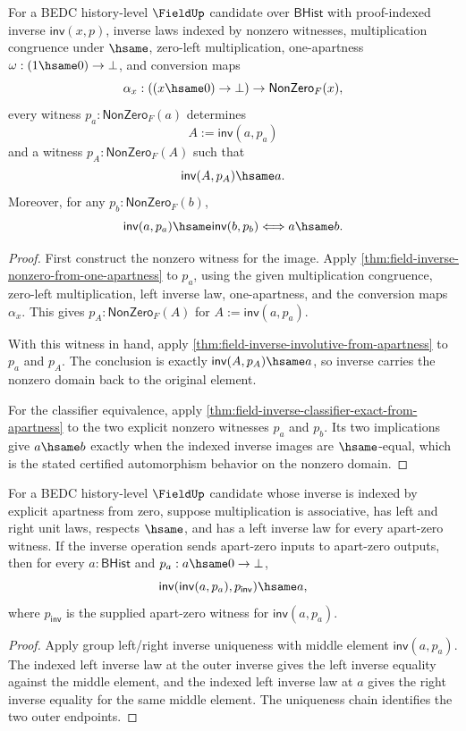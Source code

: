 \begin{theorem}
\label{thm:field-inverse-nonzero-domain-automorphism}
For a BEDC history-level $\FieldUp$ candidate over $\mathsf{BHist}$ with
proof-indexed inverse $\mathsf{inv}(x,p)$, inverse laws indexed by
nonzero witnesses, multiplication congruence under $\hsame$, zero-left
multiplication, one-apartness $\omega:(1\hsame 0)\to\bot$, and conversion
maps
$$
\alpha_x:((x\hsame 0)\to\bot)\to\mathsf{NonZero}_F(x),
$$
every witness $p_a:\mathsf{NonZero}_F(a)$ determines
$$
A:=\mathsf{inv}(a,p_a)
$$
and a witness $p_A:\mathsf{NonZero}_F(A)$ such that
$$
\mathsf{inv}(A,p_A)\hsame a.
$$
Moreover, for any $p_b:\mathsf{NonZero}_F(b)$,
$$
\mathsf{inv}(a,p_a)\hsame\mathsf{inv}(b,p_b)
\Longleftrightarrow a\hsame b.
$$
\end{theorem}
\begin{proof}
First construct the nonzero witness for the image. Apply
\autoref{thm:field-inverse-nonzero-from-one-apartness} to $p_a$, using the
given multiplication congruence, zero-left multiplication, left inverse law,
one-apartness, and the conversion maps $\alpha_x$. This gives
$p_A:\mathsf{NonZero}_F(A)$ for $A:=\mathsf{inv}(a,p_a)$.

With this witness in hand, apply
\autoref{thm:field-inverse-involutive-from-apartness} to $p_a$ and $p_A$.
The conclusion is exactly $\mathsf{inv}(A,p_A)\hsame a$, so inverse carries
the nonzero domain back to the original element.

For the classifier equivalence, apply
\autoref{thm:field-inverse-classifier-exact-from-apartness} to the two
explicit nonzero witnesses $p_a$ and $p_b$. Its two implications give
$a\hsame b$ exactly when the indexed inverse images are $\hsame$-equal,
which is the stated certified automorphism behavior on the nonzero domain.
\end{proof}

\begin{theorem}
\label{thm:field-apartzero-inverse-involutive}
For a BEDC history-level $\FieldUp$ candidate whose inverse is indexed by
explicit apartness from zero, suppose multiplication is associative, has left
and right unit laws, respects $\hsame$, and has a left inverse law for every
apart-zero witness. If the inverse operation sends apart-zero inputs to
apart-zero outputs, then for every $a:\mathsf{BHist}$ and
$p_a:a\hsame0\to\bot$,
$$
\mathsf{inv}(\mathsf{inv}(a,p_a),p_{\mathsf{inv}})\hsame a,
$$
where $p_{\mathsf{inv}}$ is the supplied apart-zero witness for
$\mathsf{inv}(a,p_a)$.
\end{theorem}
\begin{proof}
Apply group left/right inverse uniqueness with middle element
$\mathsf{inv}(a,p_a)$. The indexed left inverse law at the outer inverse gives
the left inverse equality against the middle element, and the indexed left
inverse law at $a$ gives the right inverse equality for the same middle
element. The uniqueness chain identifies the two outer endpoints.
\end{proof}

